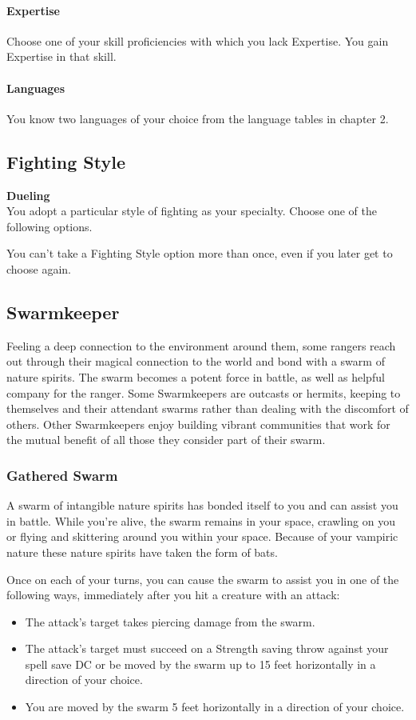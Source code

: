 \documentclass[letterpaper,openany,oneside,twocolumn]{book}
\begin{document}
\paragraph*{Expertise} Choose one of your skill proficiencies with which you lack Expertise. You gain Expertise in that skill.
\paragraph*{Languages} You know two languages of your choice from the language tables in chapter 2.
\subsection*{Fighting Style}
\textbf{Dueling}\\
You adopt a particular style of fighting as your specialty. Choose one of the following options.

You can't take a Fighting Style option more than once, even if you later get to choose again.
\subsection*{Swarmkeeper}
Feeling a deep connection to the environment around them, some rangers reach out through their magical connection to the world and bond with a swarm of nature spirits. The swarm becomes a potent force in battle, as well as helpful company for the ranger. Some Swarmkeepers are outcasts or hermits, keeping to themselves and their attendant swarms rather than dealing with the discomfort of others. Other Swarmkeepers enjoy building vibrant communities that work for the mutual benefit of all those they consider part of their swarm.
\subsubsection*{Gathered Swarm}
A swarm of intangible nature spirits has bonded itself to you and can assist you in battle. While you're alive, the swarm remains in your space, crawling on you or flying and skittering around you within your space. Because of your vampiric nature these nature spirits have taken the form of bats.

Once on each of your turns, you can cause the swarm to assist you in one of the following ways, immediately after you hit a creature with an attack:
\begin{itemize}
	\item The attack's target takes  piercing damage from the swarm.
	\item The attack's target must succeed on a Strength saving throw against your spell save DC or be moved by the swarm up to 15 feet horizontally in a direction of your choice.
	\item You are moved by the swarm 5 feet horizontally in a direction of your choice.
\end{itemize}
\end{document}
